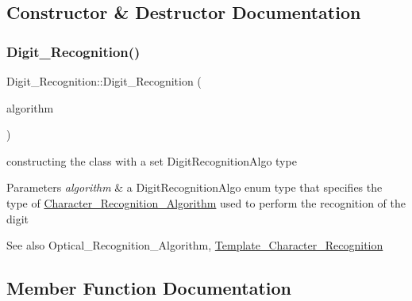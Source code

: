\subsection{Constructor \& Destructor Documentation}
\mbox{\label{class_digit___recognition_a183d686f4f9f3ce1ed555e9311d30f56}} 
\subsubsection{\texorpdfstring{Digit\+\_\+\+Recognition()}{Digit\_Recognition()}}
{\footnotesize\ttfamily Digit\+\_\+\+Recognition\+::\+Digit\+\_\+\+Recognition (\begin{DoxyParamCaption}\item[{Digit\+Recognition\+Algo}]{algorithm }\end{DoxyParamCaption})}



constructing the class with a set Digit\+Recognition\+Algo type 


\begin{DoxyParams}{Parameters}
{\em algorithm} & a Digit\+Recognition\+Algo enum type that specifies the type of \mbox{\hyperlink{class_character___recognition___algorithm}{Character\+\_\+\+Recognition\+\_\+\+Algorithm}} used to perform the recognition of the digit \\
\hline
\end{DoxyParams}
\begin{DoxySeeAlso}{See also}
Optical\+\_\+\+Recognition\+\_\+\+Algorithm, \mbox{\hyperlink{class_template___character___recognition}{Template\+\_\+\+Character\+\_\+\+Recognition}} 
\end{DoxySeeAlso}


\subsection{Member Function Documentation}
\mbox{\label{class_digit___recognition_acb87e2fb3a72d625170ab8c95ef6828f}} 
